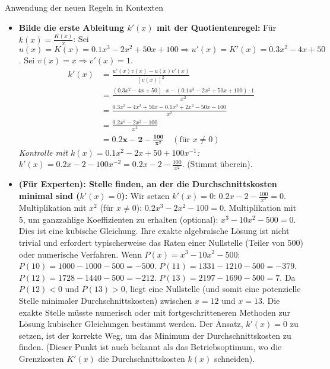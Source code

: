 \begin{loesungsumgebung}{Anwendung der neuen Regeln in Kontexten}
\begin{enumerate}[label=(\alph*)]
\begin{itemize}
        \item \textbf{Bilde die erste Ableitung $k'(x)$ mit der Quotientenregel:}
        Für $k(x) = \frac{K(x)}{x}$:
        Sei $u(x) = K(x) = 0.1x^3 - 2x^2 + 50x + 100 \Rightarrow u'(x) = K'(x) = 0.3x^2 - 4x + 50$.
        Sei $v(x) = x \Rightarrow v'(x) = 1$.
        \begin{align*}
        k'(x) &= \frac{u'(x)v(x) - u(x)v'(x)}{[v(x)]^2} \\
              &= \frac{(0.3x^2 - 4x + 50) \cdot x - (0.1x^3 - 2x^2 + 50x + 100) \cdot 1}{x^2} \\
              &= \frac{0.3x^3 - 4x^2 + 50x - 0.1x^3 + 2x^2 - 50x - 100}{x^2} \\
              &= \frac{0.2x^3 - 2x^2 - 100}{x^2} \\
              &= \mathbf{0.2x - 2 - \frac{100}{x^2}} \quad (\text{für } x \neq 0)
        \end{align*}
        \textit{Kontrolle mit $k(x) = 0.1x^2 - 2x + 50 + 100x^{-1}$:}
        $k'(x) = 0.2x - 2 - 100x^{-2} = 0.2x - 2 - \frac{100}{x^2}$. (Stimmt überein).

        \item \textbf{(Für Experten): Stelle finden, an der die Durchschnittskosten minimal sind ($k'(x)=0$):}
        Wir setzen $k'(x) = 0$:
        $0.2x - 2 - \frac{100}{x^2} = 0$.
        Multiplikation mit $x^2$ (für $x \neq 0$):
        $0.2x^3 - 2x^2 - 100 = 0$.
        Multiplikation mit 5, um ganzzahlige Koeffizienten zu erhalten (optional):
        $x^3 - 10x^2 - 500 = 0$.
        Dies ist eine kubische Gleichung. Ihre exakte algebraische Lösung ist nicht trivial und erfordert typischerweise das Raten einer Nullstelle (Teiler von 500) oder numerische Verfahren.
        Wenn $P(x) = x^3 - 10x^2 - 500$:
        $P(10) = 1000 - 1000 - 500 = -500$.
        $P(11) = 1331 - 1210 - 500 = -379$.
        $P(12) = 1728 - 1440 - 500 = -212$.
        $P(13) = 2197 - 1690 - 500 = 7$.
        Da $P(12) < 0$ und $P(13) > 0$, liegt eine Nullstelle (und somit eine potenzielle Stelle minimaler Durchschnittskosten) zwischen $x=12$ und $x=13$. Die exakte Stelle müsste numerisch oder mit fortgeschritteneren Methoden zur Lösung kubischer Gleichungen bestimmt werden. Der Ansatz, $k'(x)=0$ zu setzen, ist der korrekte Weg, um das Minimum der Durchschnittskosten zu finden. (Dieser Punkt ist auch bekannt als das Betriebsoptimum, wo die Grenzkosten $K'(x)$ die Durchschnittskosten $k(x)$ schneiden).
    \end{itemize}
\end{enumerate}

\end{loesungsumgebung}

